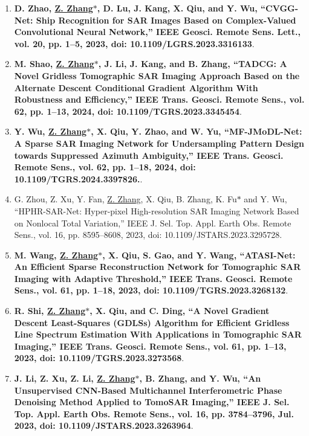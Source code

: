 \documentclass[paper=a4,fontsize=11pt]{scrartcl}
\begin{document}
\begin{enumerate}
\item \textbf{D. Zhao, \underline{Z. Zhang$\ast$}, D. Lu, J. Kang, X. Qiu, and Y. Wu, ``CVGG-Net: Ship Recognition for SAR Images Based on Complex-Valued Convolutional Neural Network,'' IEEE Geosci. Remote Sens. Lett., vol. 20, pp. 1–5, 2023, doi: 10.1109/LGRS.2023.3316133}.​

\item \textbf{M. Shao, \underline{Z. Zhang$\ast$}, J. Li, J. Kang, and B. Zhang, ``TADCG: A Novel Gridless Tomographic SAR Imaging Approach Based on the Alternate Descent Conditional Gradient Algorithm With Robustness and Efficiency,'' IEEE Trans. Geosci. Remote Sens., vol. 62, pp. 1–13, 2024, doi: 10.1109/TGRS.2023.3345454}.

\item \textbf{Y. Wu, \underline{Z. Zhang$\ast$}, X. Qiu, Y. Zhao, and W. Yu, ``MF-JMoDL-Net: A Sparse SAR Imaging Network for Undersampling Pattern Design towards Suppressed Azimuth Ambiguity,'' IEEE Trans. Geosci. Remote Sens., vol. 62, pp. 1–18, 2024, doi: 10.1109/TGRS.2024.3397826.}.

\item G. Zhou, Z. Xu, Y. Fan, \underline{Z. Zhang}, X. Qiu, B. Zhang, K. Fu$\ast$ and Y. Wu, ``HPHR-SAR-Net: Hyper-pixel High-resolution SAR Imaging Network Based on Nonlocal Total Variation,'' IEEE J. Sel. Top. Appl. Earth Obs. Remote Sens., vol. 16, pp. 8595–8608, 2023, doi: 10.1109/JSTARS.2023.3295728.

\item \textbf{M. Wang, \underline{Z. Zhang$\ast$}, X. Qiu, S. Gao, and Y. Wang, ``ATASI-Net: An Efficient Sparse Reconstruction Network for Tomographic SAR Imaging with Adaptive Threshold,'' IEEE Trans. Geosci. Remote Sens., vol. 61, pp. 1–18, 2023, doi: 10.1109/TGRS.2023.3268132}.	

\item \textbf{R. Shi, \underline{Z. Zhang$\ast$}, X. Qiu, and C. Ding, ``A Novel Gradient Descent Least-Squares (GDLSs) Algorithm for Efficient Gridless Line Spectrum Estimation With Applications in Tomographic SAR Imaging,'' IEEE Trans. Geosci. Remote Sens., vol. 61, pp. 1–13, 2023, doi: 10.1109/TGRS.2023.3273568}.

\item \textbf{J. Li, Z. Xu, Z. Li, \underline{Z. Zhang$\ast$}, B. Zhang, and Y. Wu, ``An Unsupervised CNN-Based Multichannel Interferometric Phase Denoising Method Applied to TomoSAR Imaging,'' IEEE J. Sel. Top. Appl. Earth Obs. Remote Sens., vol. 16, pp. 3784–3796, Jul. 2023, doi: 10.1109/JSTARS.2023.3263964}.


\end{enumerate}
\end{document}
